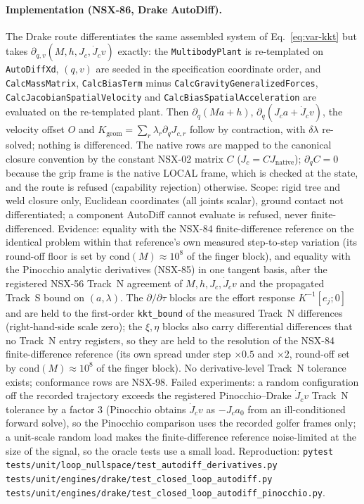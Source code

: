 \documentclass[11pt,a4paper]{article}
\begin{document}
\paragraph{Implementation (NSX-86, Drake AutoDiff).}  The Drake route
differentiates the same assembled system of Eq.~\eqref{eq:var-kkt} but takes
$\partial_{q,v}(M,h,J_c,\dot J_cv)$ exactly: the \texttt{MultibodyPlant} is
re-templated on \texttt{AutoDiffXd}, $(q,v)$ are seeded in the specification
coordinate order, and \texttt{CalcMassMatrix}, \texttt{CalcBiasTerm} minus
\texttt{CalcGravityGeneralizedForces}, \texttt{CalcJacobianSpatialVelocity} and
\texttt{CalcBiasSpatialAcceleration} are evaluated on the re-templated plant.
Then $\partial_q(M a+h)$, $\partial_q(J_ca+\dot J_cv)$, the velocity offset
$O$ and $K_{\mathrm{geom}}=\sum_r\lambda_r\partial_qJ_{c,r}$ follow by
contraction, with $\delta\lambda$ re-solved; nothing is differenced.  The native
rows are mapped to the canonical closure convention by the constant NSX-02
matrix $C$ ($J_c=CJ_{\mathrm{native}}$); $\partial_qC=0$ because the grip frame
is the native LOCAL frame, which is checked at the state, and the route is
refused (capability rejection) otherwise.  Scope: rigid tree and weld closure
only, Euclidean coordinates (all joints scalar), ground contact not
differentiated; a component AutoDiff cannot evaluate is refused, never
finite-differenced.  Evidence: equality with the NSX-84 finite-difference
reference on the identical problem within that reference's own measured
step-to-step variation (its round-off floor is set by $\mathrm{cond}(M)\approx
10^{8}$ of the finger block), and equality with the Pinocchio analytic derivatives (NSX-85) in one tangent basis, after the registered
NSX-56 Track~N agreement of $M,h,J_c,\dot J_cv$ and the propagated Track~S bound
on $(a,\lambda)$.  The $\partial/\partial\tau$ blocks are the effort response
$K^{-1}[e_j;0]$ and are held to the first-order \texttt{kkt\_bound} of the
measured Track~N differences (right-hand-side scale zero); the $\xi,\eta$ blocks
also carry differential differences that no Track~N entry registers, so they are
held to the resolution of the NSX-84 finite-difference reference (its own spread
under step $\times0.5$ and $\times2$, round-off set by $\mathrm{cond}(M)\approx
10^{8}$ of the finger block).  No derivative-level Track~N tolerance exists;
conformance rows are NSX-98.  Failed experiments: a random configuration off the recorded
trajectory exceeds the registered Pinocchio--Drake $\dot J_cv$ Track~N tolerance
by a factor 3 (Pinocchio obtains $\dot J_cv$ as $-J_ca_0$ from an
ill-conditioned forward solve), so the Pinocchio comparison uses the recorded
golfer frames only; a unit-scale random load makes the finite-difference
reference noise-limited at the size of the signal, so the oracle tests use a
small load.  Reproduction:
\texttt{pytest tests/unit/loop\_nullspace/test\_autodiff\_derivatives.py
tests/unit/engines/drake/test\_closed\_loop\_autodiff.py
tests/unit/engines/drake/test\_closed\_loop\_autodiff\_pinocchio.py}.
\end{document}
